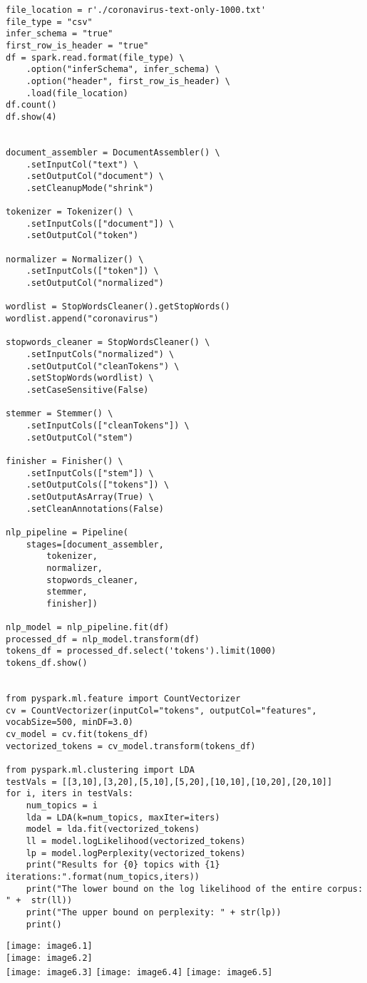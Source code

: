 \documentclass[]{article}
\begin{document}
\begin{verbatim}
file_location = r'./coronavirus-text-only-1000.txt'
file_type = "csv"
infer_schema = "true"
first_row_is_header = "true"
df = spark.read.format(file_type) \
	.option("inferSchema", infer_schema) \
	.option("header", first_row_is_header) \
	.load(file_location)
df.count()
df.show(4)


document_assembler = DocumentAssembler() \
	.setInputCol("text") \
	.setOutputCol("document") \
	.setCleanupMode("shrink")

tokenizer = Tokenizer() \
	.setInputCols(["document"]) \
	.setOutputCol("token")

normalizer = Normalizer() \
	.setInputCols(["token"]) \
	.setOutputCol("normalized")

wordlist = StopWordsCleaner().getStopWords()
wordlist.append("coronavirus")

stopwords_cleaner = StopWordsCleaner() \
	.setInputCols("normalized") \
	.setOutputCol("cleanTokens") \
	.setStopWords(wordlist) \
	.setCaseSensitive(False)

stemmer = Stemmer() \
	.setInputCols(["cleanTokens"]) \
	.setOutputCol("stem")

finisher = Finisher() \
	.setInputCols(["stem"]) \
	.setOutputCols(["tokens"]) \
	.setOutputAsArray(True) \
	.setCleanAnnotations(False)

nlp_pipeline = Pipeline(
	stages=[document_assembler, 
		tokenizer,
		normalizer,
		stopwords_cleaner,
		stemmer, 
		finisher])

nlp_model = nlp_pipeline.fit(df)
processed_df = nlp_model.transform(df)
tokens_df = processed_df.select('tokens').limit(1000)
tokens_df.show()


from pyspark.ml.feature import CountVectorizer
cv = CountVectorizer(inputCol="tokens", outputCol="features", 
vocabSize=500, minDF=3.0)
cv_model = cv.fit(tokens_df)
vectorized_tokens = cv_model.transform(tokens_df)

from pyspark.ml.clustering import LDA
testVals = [[3,10],[3,20],[5,10],[5,20],[10,10],[10,20],[20,10]]
for i, iters in testVals:
	num_topics = i
	lda = LDA(k=num_topics, maxIter=iters)
	model = lda.fit(vectorized_tokens)
	ll = model.logLikelihood(vectorized_tokens)
	lp = model.logPerplexity(vectorized_tokens)
	print("Results for {0} topics with {1} iterations:".format(num_topics,iters))
	print("The lower bound on the log likelihood of the entire corpus: " +  str(ll))
	print("The upper bound on perplexity: " + str(lp))
	print()
\end{verbatim}
\texttt{[image: image6.1]} \\
\texttt{[image: image6.2]} \\
\texttt{[image: image6.3]} %
\texttt{[image: image6.4]} %
\texttt{[image: image6.5]} %
\end{document}
